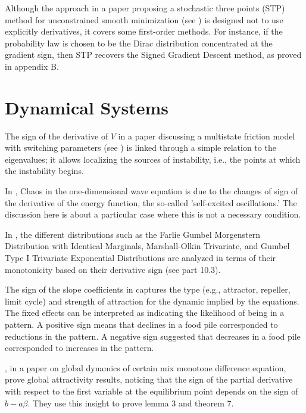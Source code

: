 \documentclass[11pt]{book}
\begin{document}
Although the approach in a paper proposing a stochastic three points (STP)
method for unconstrained smooth minimization (see \cite{bergou2020stochastic}) is designed
not to use explicitly derivatives, it covers some first-order methods.
For instance, if the probability law is chosen to be the Dirac distribution
concentrated at the gradient sign, then STP recovers the Signed Gradient
Descent method, as proved in appendix B.


\section{Dynamical Systems}

The sign of the derivative of $V$ in a paper discussing a multistate friction model with
switching parameters (see \cite{capone2005instability})
is linked through a simple relation to the eigenvalues; it allows
localizing the sources of instability, i.e., the points at which the
instability begins.

In \cite{solis2005chaos}, Chaos in the one-dimensional wave equation is due to the changes of sign of
the derivative of the energy function, the so-called 'self-excited
oscillations.' The discussion here is about a particular case where
this is not a necessary condition.

In \cite{yilmaz2015reliability}, the different distributions such
as the Farlie Gumbel Morgenstern Distribution with Identical Marginals,
Marshall-Olkin Trivariate, and Gumbel Type I Trivariate Exponential
Distributions are analyzed in terms of their monotonicity based
on their derivative sign (see part 10.3).

The sign of the slope coefficients in \cite{butner2017modeling} captures
the type (e.g., attractor, repeller, limit cycle) and strength of
attraction for the dynamic implied by the equations. The
fixed effects can be interpreted as indicating the likelihood
of being in a pattern. A positive sign means that declines
in a food pile corresponded to reductions in the pattern. A negative
sign suggested that decreases in a food pile corresponded to increases
in the pattern.

\cite{kalabuvsic2018global}, in a paper on global dynamics of
certain mix monotone difference equation,
prove global attractivity results, noticing that the
sign of the partial derivative with respect to the first variable
at the equilibrium point depends on the sign of $b-a\beta$. They
use this insight to prove lemma 3 and theorem 7.
\end{document}
